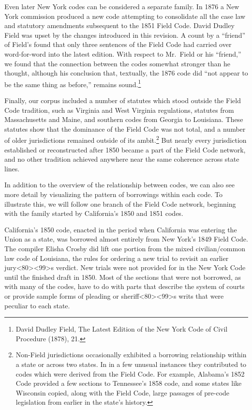 \documentclass[12pt,]{article}
\let\rmarkdownfootnote\footnote%
\def\footnote{\protect\rmarkdownfootnote}
\begin{document}
Even later New York codes can be considered a separate family. In 1876 a
New York commission produced a new code attempting to consolidate all
the case law and statutory amendments subsequent to the 1851 Field Code.
David Dudley Field was upset by the changes introduced in this revision.
A count by a ``friend'' of Field's found that only three sentences of
the Field Code had carried over word-for-word into the latest edition.
With respect to Mr.~Field or his ``friend,'' we found that the
connection between the codes somewhat stronger than he thought, although
his conclusion that, textually, the 1876 code did ``not appear to be the
same thing as before,'' remains sound.\footnote{David Dudley Field, The
  Latest Edition of the New York Code of Civil Procedure (1878), 21.}

Finally, our corpus included a number of statutes which stood outside
the Field Code tradition, such as Virginia and West Virginia
regulations, statutes from Massachusetts and Maine, and southern codes
from Georgia to Louisiana. These statutes show that the dominance of the
Field Code was not total, and a number of older jurisdictions remained
outside of its ambit.\footnote{Non-Field jurisdictions occasionally
  exhibited a borrowing relationship within a state or across two
  states. In in a few unusual instances they contributed to codes which
  were derived from the Field Code. For example, Alabama's 1852 Code
  provided a few sections to Tennessee's 1858 code, and some states like
  Wisconsin copied, along with the Field Code, large passages of
  pre-code legislation from earlier in the state's history.} But nearly
every jurisdiction established or reconstructed after 1850 became a part
of the Field Code network, and no other tradition achieved anywhere near
the same coherence across state lines.

In addition to the overview of the relationship between codes, we can
also see more detail by visualizing the pattern of borrowings within
each code. To illustrate this, we will follow one branch of the Field
Code network, beginning with the family started by California's 1850 and
1851 codes.

California's 1850 code, enacted in the period when California was
entering the Union as a state, was borrowed almost entirely from New
York's 1849 Field Code. The compiler Elisha Crosby did lift one portion
from the mixed civilian/common law code of Louisiana, the rules for
ordering a new trial to revisit an earlier
jury\textless80\textgreater\textless99\textgreater s verdict. New trials
were not provided for in the New York Code until the finished draft in
1850. Most of the sections that were not borrowed, as with many of the
codes, have to do with parts that describe the system of courts or
provide sample forms of pleading or
sheriff\textless80\textgreater\textless99\textgreater s writs that were
peculiar to each state.
\end{document}
